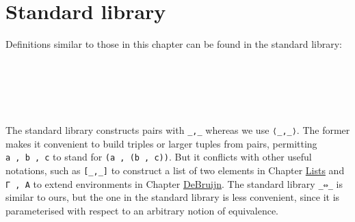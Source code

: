 \hypertarget{standard-library}{%
\section{Standard library}\label{standard-library}}

Definitions similar to those in this chapter can be found in the
standard library:

\begin{fence}
\begin{code}%
\>[0]\AgdaSpace{}%
\AgdaSpace{}%
\AgdaSpace{}%
\AgdaSymbol{(}\AgdaSymbol{;}\AgdaSpace{}%
\AgdaSymbol{;}\AgdaSpace{}%
\AgdaSymbol{)}\AgdaSpace{}%
\AgdaSpace{}%
\AgdaSymbol{(}\AgdaOperator{\AgdaInductiveConstructor{\AgdaUnderscore{},\AgdaUnderscore{}}}\AgdaSpace{}%
\AgdaSpace{}%
\AgdaSymbol{)}\<%
\\
\>[0]\AgdaSpace{}%
\AgdaSpace{}%
\AgdaSpace{}%
\AgdaSymbol{(}\AgdaSymbol{;}\AgdaSpace{}%
\AgdaSymbol{)}\<%
\\
\>[0]\AgdaSpace{}%
\AgdaSpace{}%
\AgdaSpace{}%
\AgdaSymbol{(}\AgdaSymbol{;}\AgdaSpace{}%
\AgdaSymbol{;}\AgdaSpace{}%
\AgdaSymbol{)}\AgdaSpace{}%
\AgdaSpace{}%
\AgdaSymbol{(}\AgdaOperator{\AgdaFunction{[\AgdaUnderscore{},\AgdaUnderscore{}]}}\AgdaSpace{}%
\AgdaSpace{}%
\AgdaSymbol{)}\<%
\\
\>[0]\AgdaSpace{}%
\AgdaSpace{}%
\AgdaSpace{}%
\AgdaSymbol{(}\AgdaSymbol{;}\AgdaSpace{}%
\AgdaSymbol{)}\<%
\\
\>[0]\AgdaSpace{}%
\AgdaSpace{}%
\AgdaSpace{}%
\AgdaSymbol{(}\AgdaSymbol{)}\<%
\end{code}
\end{fence}

The standard library constructs pairs with \texttt{\_,\_} whereas we use
\texttt{⟨\_,\_⟩}. The former makes it convenient to build triples or
larger tuples from pairs, permitting \texttt{a\ ,\ b\ ,\ c} to stand for
\texttt{(a\ ,\ (b\ ,\ c))}. But it conflicts with other useful
notations, such as \texttt{{[}\_,\_{]}} to construct a list of two
elements in Chapter \protect\hyperlink{Lists}{Lists} and
\texttt{Γ\ ,\ A} to extend environments in Chapter
\protect\hyperlink{DeBruijn}{DeBruijn}. The standard library
\texttt{\_⇔\_} is similar to ours, but the one in the standard library
is less convenient, since it is parameterised with respect to an
arbitrary notion of equivalence.

